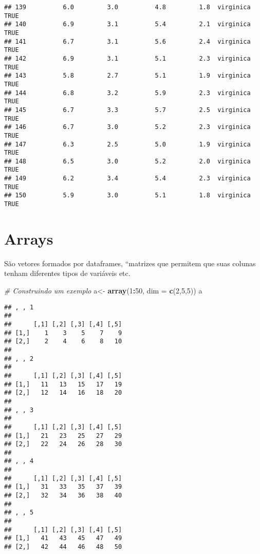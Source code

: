 \documentclass[]{article}
\newenvironment{Shaded}{\begin{snugshade}}{\end{snugshade}}
\newcommand{\KeywordTok}[1]{\textcolor[rgb]{0.13,0.29,0.53}{\textbf{#1}}}
\newcommand{\DataTypeTok}[1]{\textcolor[rgb]{0.13,0.29,0.53}{#1}}
\newcommand{\DecValTok}[1]{\textcolor[rgb]{0.00,0.00,0.81}{#1}}
\newcommand{\StringTok}[1]{\textcolor[rgb]{0.31,0.60,0.02}{#1}}
\newcommand{\CommentTok}[1]{\textcolor[rgb]{0.56,0.35,0.01}{\textit{#1}}}
\newcommand{\OperatorTok}[1]{\textcolor[rgb]{0.81,0.36,0.00}{\textbf{#1}}}
\newcommand{\NormalTok}[1]{#1}
\begin{document}
\begin{verbatim}
## 139          6.0         3.0          4.8         1.8  virginica   TRUE
## 140          6.9         3.1          5.4         2.1  virginica   TRUE
## 141          6.7         3.1          5.6         2.4  virginica   TRUE
## 142          6.9         3.1          5.1         2.3  virginica   TRUE
## 143          5.8         2.7          5.1         1.9  virginica   TRUE
## 144          6.8         3.2          5.9         2.3  virginica   TRUE
## 145          6.7         3.3          5.7         2.5  virginica   TRUE
## 146          6.7         3.0          5.2         2.3  virginica   TRUE
## 147          6.3         2.5          5.0         1.9  virginica   TRUE
## 148          6.5         3.0          5.2         2.0  virginica   TRUE
## 149          6.2         3.4          5.4         2.3  virginica   TRUE
## 150          5.9         3.0          5.1         1.8  virginica   TRUE
\end{verbatim}

\section{Arrays}\label{arrays}

São vetores formados por dataframes, ``matrizes que permitem que suas
colunas tenham diferentes tipos de variáveis etc.

\begin{Shaded}
\begin{Highlighting}[]
\CommentTok{# Construindo um exemplo}
\NormalTok{a<-}\StringTok{ }\KeywordTok{array}\NormalTok{(}\DecValTok{1}\OperatorTok{:}\DecValTok{50}\NormalTok{, }\DataTypeTok{dim =} \KeywordTok{c}\NormalTok{(}\DecValTok{2}\NormalTok{,}\DecValTok{5}\NormalTok{,}\DecValTok{5}\NormalTok{))}
\NormalTok{a}
\end{Highlighting}
\end{Shaded}

\begin{verbatim}
## , , 1
## 
##      [,1] [,2] [,3] [,4] [,5]
## [1,]    1    3    5    7    9
## [2,]    2    4    6    8   10
## 
## , , 2
## 
##      [,1] [,2] [,3] [,4] [,5]
## [1,]   11   13   15   17   19
## [2,]   12   14   16   18   20
## 
## , , 3
## 
##      [,1] [,2] [,3] [,4] [,5]
## [1,]   21   23   25   27   29
## [2,]   22   24   26   28   30
## 
## , , 4
## 
##      [,1] [,2] [,3] [,4] [,5]
## [1,]   31   33   35   37   39
## [2,]   32   34   36   38   40
## 
## , , 5
## 
##      [,1] [,2] [,3] [,4] [,5]
## [1,]   41   43   45   47   49
## [2,]   42   44   46   48   50
\end{verbatim}
\end{document}
